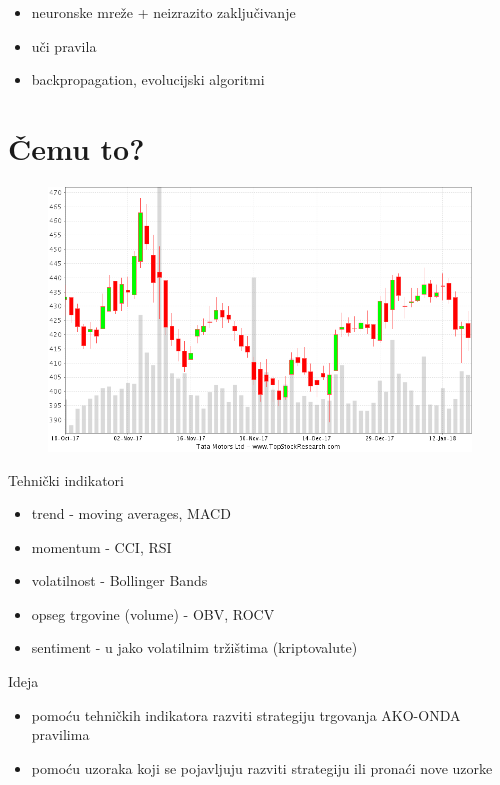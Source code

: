 \documentclass{beamer}
\begin{document}
\begin{frame}{}

\begin{itemize}
  \item neuronske mreže + neizrazito zaključivanje
  \item uči pravila
  \item backpropagation, evolucijski algoritmi
\end{itemize}
\end{frame}

\section{Čemu to?}

\begin{frame}{}
\begin{figure}[h]
  \includegraphics[width=\textwidth]{img/candlestick.png}
\end{figure}
\end{frame}

\begin{frame}{Tehnički indikatori}

\begin{itemize}
  \item trend - moving averages, MACD
  \item momentum - CCI, RSI
  \item volatilnost - Bollinger Bands
  \item opseg trgovine (volume) - OBV, ROCV
  \item sentiment - u jako volatilnim tržištima (kriptovalute)
\end{itemize}
\end{frame}

\begin{frame}{Ideja}
\begin{itemize}
  \item pomoću tehničkih indikatora razviti strategiju trgovanja AKO-ONDA pravilima
  \item pomoću uzoraka koji se pojavljuju razviti strategiju ili pronaći nove uzorke
\end{itemize}
\end{frame}
\end{document}
